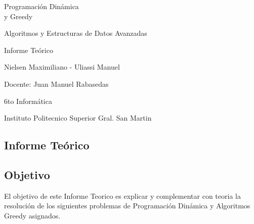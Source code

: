 \documentclass[10pt]{article}
\begin{document}
	\pagestyle{fancy}
	\renewcommand{\headrulewidth}{0.4pt}
	\renewcommand{\footrulewidth}{0.4pt}
	
	\begin{titlepage}
		\null
		\vspace{4cm}
		\centering
		{\Huge Programaci\'on Din\'amica\\ y Greedy}
		
		\vspace{0.2cm}
		
		{\LARGE Algoritmos y Estructuras de Datos Avanzadas}
		
		\vspace{0.2cm}
		
		{\large Informe Te\'orico}
		
		\vspace{1.5cm}
		
		{\LARGE Nielsen Maximiliano - Uliassi Manuel}
		
		\vspace{0.15cm}
		
		{\large Docente: Juan Manuel Rabasedas}
		
		\vspace{0.15cm}
		
		{\large 6to Inform\'atica}
		
		\vspace{0.15cm}
		
		{\large Instituto Politecnico Superior Gral. San Martin}
		\vfill
		
	\end{titlepage}
	\begin{center}
		\section*{\LARGE Informe Te\'orico}
	\end{center}
	\subsection*{Objetivo}
	El objetivo de este Informe Teorico es explicar y complementar con teoria la resoluci\'on de los siguientes problemas de Programaci\'on Din\'amica y Algoritmos Greedy asignados.
\end{document}
